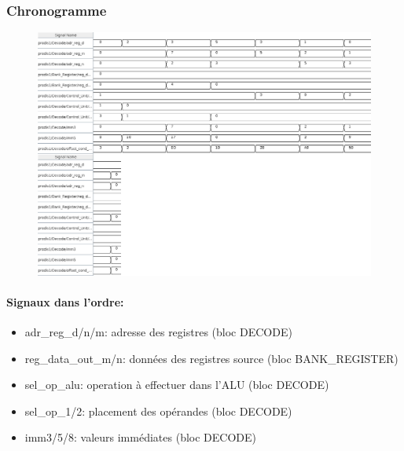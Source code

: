\documentclass[a4paper]{article} %
\begin{document}
\subsubsection{Chronogramme}
\begin{figure}[H]
    \centering
    \includegraphics[width=1\textwidth]{src/CHRONO_ETAPE1.png}
    \label{fig:Chronogramme}
\end{figure}
\paragraph{Signaux dans l'ordre:}
\begin{itemize}
    \item     adr\_reg\_d/n/m: adresse des registres (bloc DECODE)
    \item     reg\_data\_out\_m/n: données des registres source (bloc BANK\_REGISTER)
    \item     sel\_op\_alu: operation à effectuer dans l'ALU (bloc DECODE)
    \item     sel\_op\_1/2: placement des opérandes (bloc DECODE)
    \item     imm3/5/8: valeurs immédiates (bloc DECODE)
\end{itemize}
\end{document}
